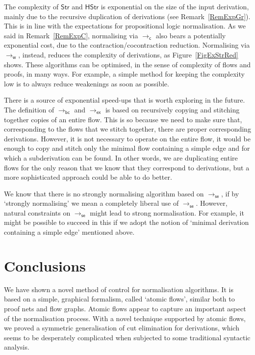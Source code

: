 \documentclass[a4paper]{LMCS}
\begin{document}
The complexity of ${\mathsf{Str}}$ and ${\mathsf{HStr}}$ is exponential on the size of the input derivation, mainly due to the recursive duplication of derivations (see Remark~\ref{RemExpGr}). This is in line with the expectations for propositional logic normalisation. As we said in Remark~\ref{RemExpC}, normalising via $\to_{{\mathsf c}}$ also bears a potentially exponential cost, due to the contraction/cocontraction reduction. Normalising via $\to_{{\mathsf w}}$, instead, reduces the complexity of derivations, as Figure~\ref{FigExStrRed} shows. These algorithms can be optimised, in the sense of complexity of flows and proofs, in many ways. For example, a simple method for keeping the complexity low is to always reduce weakenings as soon as possible.

There is a source of exponential speed-ups that is worth exploring in the future. The definition of $\to_{{\mathsf{bc}}}$ and $\to_{{\mathsf{ex}}}$ is based on recursively copying and stitching together copies of an entire flow. This is so because we need to make sure that, corresponding to the flows that we stitch together, there are proper corresponding derivations. However, it is not necessary to operate on the entire flow, it would be enough to copy and stitch only the minimal flow containing a simple edge and for which a subderivation can be found. In other words, we are duplicating entire flows for the only reason that we know that they correspond to derivations, but a more sophisticated approach could be able to do better.

We know that there is no strongly normalising algorithm based on $\to_{{\mathsf{se}}}$, if by `strongly normalising' we mean a completely liberal use of $\to_{{\mathsf{se}}}$. However, natural constraints on $\to_{{\mathsf{se}}}$ might lead to strong normalisation. For example, it might be possible to succeed in this if we adopt the notion of `minimal derivation containing a simple edge' mentioned above.

\section{Conclusions}

We have shown a novel method of control for normalisation algorithms. It is based on a simple, graphical formalism, called `atomic flows', similar both to proof nets and flow graphs. Atomic flows appear to capture an important aspect of the normalisation process. With a novel technique supported by atomic flows, we proved a symmetric generalisation of cut elimination for derivations, which seems to be desperately complicated when subjected to some traditional syntactic analysis.
\end{document}
